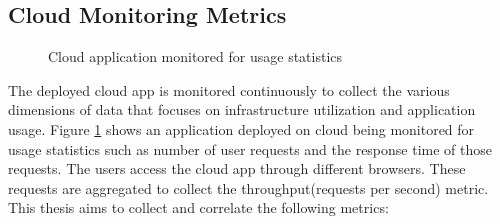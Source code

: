 \documentclass[article,type=msc,colorback,12pt,accentcolor=tud8b,table]{tudthesis}
\begin{document}
\subsection{Cloud Monitoring Metrics} 
	
 \begin{figure}[!h]
 	\begin{center}
 		\makebox[\textwidth]{\texttt{[image: 4-1]}}
 	\end{center}
 	\caption{Cloud application monitored for usage statistics}
 	\label{fig:cloud_app_monitored}
  \end{figure}	
	
The deployed cloud app is monitored continuously to collect the various dimensions of data that focuses on infrastructure utilization and application usage. Figure \ref{fig:cloud_app_monitored} shows an application deployed on cloud being monitored for usage statistics such as number of user requests and the response time of those requests. The users access the cloud app through different browsers. These requests are aggregated to collect the throughput(requests per second) metric. This thesis aims to collect and correlate the following metrics:
\end{document}
